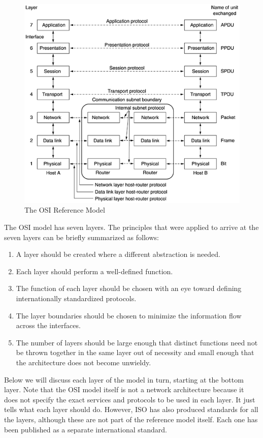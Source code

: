 \documentclass[b5paper,11pt]{memoir}
\begin{document}
\begin{figure}
   \centering
   \includegraphics[width=\textwidth]{images/01fig20.png}
   \caption{The OSI Reference Model}
   \label{fig:osi-model}
\end{figure}


The OSI model has seven layers.
The principles that were applied to arrive at the seven layers can be briefly summarized as follows:

\begin{enumerate}
\item A layer should be created where a different abstraction is needed.
\item Each layer should perform a well-defined function.
\item The function of each layer should be chosen with an eye toward defining internationally standardized protocols.
\item The layer boundaries should be chosen to minimize the information flow across the interfaces.
\item The number of layers should be large enough that distinct functions need not be thrown together in the same layer out of necessity and small enough that the architecture does not become unwieldy.
\end{enumerate}

Below we will discuss each layer of the model in turn, starting at the
bottom layer. Note that the OSI model itself is not a network
architecture because it does not specify the exact services and
protocols to be used in each layer. It just tells what each layer should
do. However, ISO has also produced standards for all the layers,
although these are not part of the reference model itself. Each one has
been published as a separate international standard.
\end{document}
